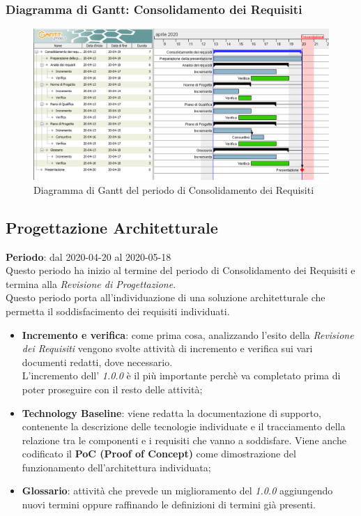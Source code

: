 	\subsubsection{Diagramma di Gantt: Consolidamento dei Requisiti}
		\begin{figure}[h]
			\centering
			\includegraphics[width=1.1\textwidth]{./res/img/DiagrammiGantt/cons_req_gantt.png}
			\caption{Diagramma di Gantt del periodo di Consolidamento dei Requisiti}
		\end{figure}
\newpage

\subsection{Progettazione Architetturale}
\textbf{Periodo}: dal 2020-04-20 al 2020-05-18 \\
Questo periodo ha inizio al termine del periodo di Consolidamento dei Requisiti e termina alla \textit{Revisione di Progettazione}. \\
Questo periodo porta all'individuazione di una soluzione architetturale che permetta il soddisfacimento dei requisiti individuati.
\begin{itemize}
	\item \textbf{Incremento e verifica}: come prima cosa, analizzando l'esito della \textit{Revisione dei Requisiti} vengono svolte attività di incremento e verifica sui vari documenti redatti, dove necessario. \\
	L'incremento dell'\textit{\AdR{} 1.0.0} è il più importante perchè va completato prima di poter proseguire con il resto delle attività;
	\item \textbf{Technology Baseline}: viene redatta la documentazione di supporto, contenente la descrizione delle tecnologie individuate e il tracciamento della relazione tra le componenti e i requisiti che vanno a soddisfare. Viene anche codificato il \textbf{PoC (Proof of Concept)} come dimostrazione del funzionamento dell'architettura individuata;
	\item \textbf{Glossario}: attività che prevede un miglioramento del \textit{\Glossario{} 1.0.0} aggiungendo nuovi termini oppure raffinando le definizioni di termini già presenti.
\end{itemize}
